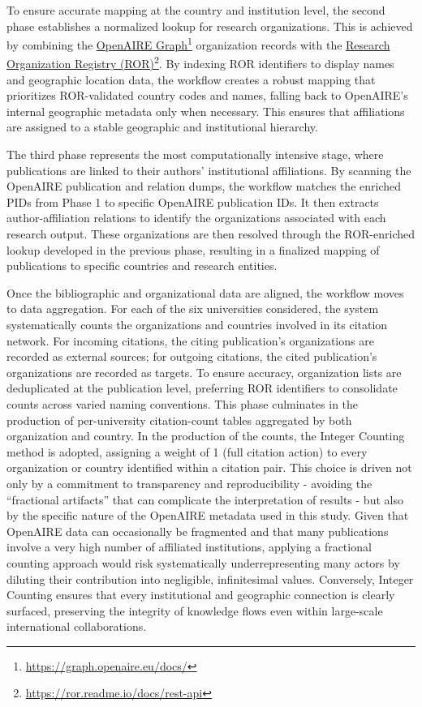 \documentclass[year=2026]{cup-journal}
\begin{document}
To ensure accurate mapping at the country and institution level, the second phase establishes a normalized lookup for research organizations. This is achieved by combining the \href{https://graph.openaire.eu/docs/}{OpenAIRE Graph}\footnote{\url{https://graph.openaire.eu/docs/}} organization records with the \href{https://ror.readme.io/docs/rest-api}{Research Organization Registry (ROR)}\footnote{\url{https://ror.readme.io/docs/rest-api}}. By indexing ROR identifiers to display names and geographic location data, the workflow creates a robust mapping that prioritizes ROR-validated country codes and names, falling back to OpenAIRE’s internal geographic metadata only when necessary. This ensures that affiliations are assigned to a stable geographic and institutional hierarchy.

The third phase represents the most computationally intensive stage, where publications are linked to their authors' institutional affiliations. By scanning the OpenAIRE publication and relation dumps, the workflow matches the enriched PIDs from Phase 1 to specific OpenAIRE publication IDs. It then extracts author-affiliation relations to identify the organizations associated with each research output. These organizations are then resolved through the ROR-enriched lookup developed in the previous phase, resulting in a finalized mapping of publications to specific countries and research entities.

Once the bibliographic and organizational data are aligned, the workflow moves to data aggregation. For each of the six universities considered, the system systematically counts the organizations and countries involved in its citation network. For incoming citations, the citing publication's organizations are recorded as external sources; for outgoing citations, the cited publication's organizations are recorded as targets. To ensure accuracy, organization lists are deduplicated at the publication level, preferring ROR identifiers to consolidate counts across varied naming conventions. This phase culminates in the production of per-university citation-count tables aggregated by both organization and country. In the production of the counts, the Integer Counting method is adopted, assigning a weight of 1 (full citation action) to every organization or country identified within a citation pair. This choice is driven not only by a commitment to transparency and reproducibility - avoiding the “fractional artifacts” that can complicate the interpretation of results - but also by the specific nature of the OpenAIRE metadata used in this study. Given that OpenAIRE data can occasionally be fragmented and that many publications involve a very high number of affiliated institutions, applying a fractional counting approach would risk systematically underrepresenting many actors by diluting their contribution into negligible, infinitesimal values. Conversely, Integer Counting ensures that every institutional and geographic connection is clearly surfaced, preserving the integrity of knowledge flows even within large-scale international collaborations.
\end{document}
